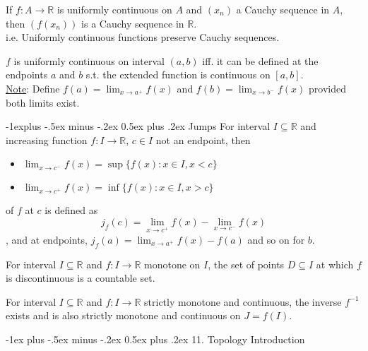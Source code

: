\documentclass[10pt,landscape,letterpaper]{article}
\makeatletter
\renewcommand{\section}{\@startsection{section}{1}{0mm}%
                                {-1ex plus -.5ex minus -.2ex}%
                                {0.5ex plus .2ex}%
                                {\sffamily\large}}
\renewcommand{\subsection}{\@startsection{subsection}{2}{0mm}%
                                {-1explus -.5ex minus -.2ex}%
                                {0.5ex plus .2ex}%
                                {\sffamily\normalsize\itshape}}
\makeatother
\begin{document}
\begin{multicols}{3}
 If $f: A \to \mathbb{R}$ is uniformly continuous on $A$ and $(x_n)$ a Cauchy sequence in $A$, then $(f(x_n))$ is a Cauchy sequence in $\mathbb{R}$.
\\
i.e. Uniformly continuous functions preserve Cauchy sequences.



 $f$ is uniformly continuous on interval $(a, b)$ iff. it can be defined at the endpoints $a$ and $b$ s.t. the extended function is continuous on $[a, b]$.
\\
\underline{Note}: Define $f(a) = \lim_{x \to a^+} f(x)$ and $f(b) = \lim_{x \to b^-} f(x)$ provided both limits exist.






\subsection{Jumps}
 For interval $I \subseteq \mathbb{R}$ and increasing function $f: I \to \mathbb{R}$, $c \in I$ not an endpoint, then
\begin{itemize}
    \item $\lim_{x \to c^-} f(x) = \sup\{ f(x): x \in I, x < c \}$
    \item $\lim_{x \to c^+} f(x) = \inf\{ f(x): x \in I, x > c \}$
\end{itemize}

 of $f$ at $c$ is defined as $$j_f (c) = \lim_{x \to c^+} f(x) - \lim_{x \to c^-} f(x)$$, and at endpoints, $j_f(a) = \lim_{x \to a^+} f(x) - f(a)$ and so on for $b$.



 For interval $I \subseteq \mathbb{R}$ and $f: I \to \mathbb{R}$ monotone on $I$, the set of points $D \subseteq I$ at which $f$ is discontinuous is a countable set.


 For interval $I \subseteq \mathbb{R}$ and $f: I \to \mathbb{R}$ strictly monotone and continuous, the inverse $f^{-1}$ exists and is also strictly monotone and continuous on $J = f(I)$.




\section{11. Topology Introduction}

\end{multicols}
\end{document}
